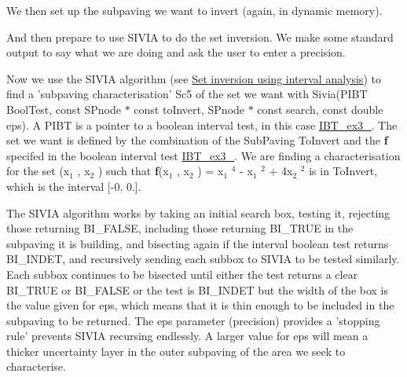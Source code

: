 \begin{DoxyCodeInclude}

\end{DoxyCodeInclude}


\-We then set up the subpaving we want to invert (again, in dynamic memory).


\begin{DoxyCodeInclude}

\end{DoxyCodeInclude}


\-And then prepare to use \-S\-I\-V\-I\-A to do the set inversion. \-We make some standard output to say what we are doing and ask the user to enter a precision.


\begin{DoxyCodeInclude}

\end{DoxyCodeInclude}


\-Now we use the \-S\-I\-V\-I\-A algorithm (see \hyperlink{AIASubPavings_AIAsec_SIVIA}{\-Set inversion using interval analysis}) to find a 'subpaving characterisation' \-Sc5 of the set we want with \-Sivia(\-P\-I\-B\-T \-Bool\-Test, const \-S\-Pnode $\ast$ const to\-Invert, \-S\-Pnode $\ast$ const search, const double eps). \-A \-P\-I\-B\-T is a pointer to a boolean interval test, in this case \hyperlink{newsubpavings_NewIBT_ex3_4}{\-I\-B\-T\-\_\-ex3\-\_}. \-The set we want is defined by the combination of the \-Sub\-Paving \-To\-Invert and the {\bfseries f} specifed in the boolean interval test \hyperlink{newsubpavings_NewIBT_ex3_4}{\-I\-B\-T\-\_\-ex3\-\_}. \-We are finding a characterisation for the set (x$_{\mbox{1}}$ , x$_{\mbox{2}}$ ) such that {\bfseries f}(x$_{\mbox{1}}$ , x$_{\mbox{2}}$ ) = x$_{\mbox{1}}$ $^{\mbox{4}}$  -\/ x$_{\mbox{1}}$ $^{\mbox{2}}$  + 4x$_{\mbox{2}}$ $^{\mbox{2}}$  is in \-To\-Invert, which is the interval \mbox{[}-\/0. 0.\mbox{]}.


\begin{DoxyCodeInclude}

\end{DoxyCodeInclude}


\-The \-S\-I\-V\-I\-A algorithm works by taking an initial search box, testing it, rejecting those returning \-B\-I\-\_\-\-F\-A\-L\-S\-E, including those returning \-B\-I\-\_\-\-T\-R\-U\-E in the subpaving it is building, and bisecting again if the interval boolean test returns \-B\-I\-\_\-\-I\-N\-D\-E\-T, and recursively sending each subbox to \-S\-I\-V\-I\-A to be tested similarly. \-Each subbox continues to be bisected until either the test returns a clear \-B\-I\-\_\-\-T\-R\-U\-E or \-B\-I\-\_\-\-F\-A\-L\-S\-E or the test is \-B\-I\-\_\-\-I\-N\-D\-E\-T but the width of the box is the value given for eps, which means that it is thin enough to be included in the subpaving to be returned. \-The eps parameter (precision) provides a 'stopping rule' prevents \-S\-I\-V\-I\-A recursing endlessly. \-A larger value for eps will mean a thicker uncertainty layer in the outer subpaving of the area we seek to characterise.


